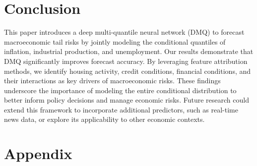 \documentclass[12pt]{article}
\newcommand{\resultsdate}{2026-02-05}
\begin{document}





\section{Conclusion} \label{section:conclusion}

This paper introduces a deep multi-quantile neural network (DMQ) to forecast macroeconomic tail risks by jointly modeling the conditional quantiles of inflation, industrial production, and unemployment. Our results demonstrate that DMQ significantly improves forecast accuracy. By leveraging feature attribution methods, we identify housing activity, credit conditions, financial conditions, and their interactions as key drivers of macroeconomic risks. These findings underscore the importance of modeling the entire conditional distribution to better inform policy decisions and manage economic risks. Future research could extend this framework to incorporate additional predictors, such as real-time news data, or explore its applicability to other economic contexts.



\newpage
\singlespacing



\clearpage
\appendix
{}


\appendix

\section{Appendix}
\end{document}
